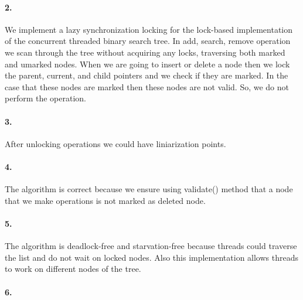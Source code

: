 \paragraph{2.}
We implement a lazy synchronization locking for the lock-based
implementation of the concurrent threaded binary search tree.  In add,
search, remove operation we scan through the tree without acquiring
any locks, traversing both marked and umarked nodes.  When we are
going to insert or delete a node then we lock the parent, current, and
child pointers and we check if they are marked. In the case that these
nodes are marked then these nodes are not valid. So, we do not perform
the operation.

\paragraph{3.}
After unlocking operations we could have liniarization points.

\paragraph{4.}
The algorithm is correct because we ensure using validate() method
that a node that we make operations is not marked as deleted node.

\paragraph{5.}
The algorithm is deadlock-free and starvation-free because threads
could traverse the list and do not wait on locked nodes. Also this
implementation allows threads to work on different nodes of the tree.

\paragraph{6.}
